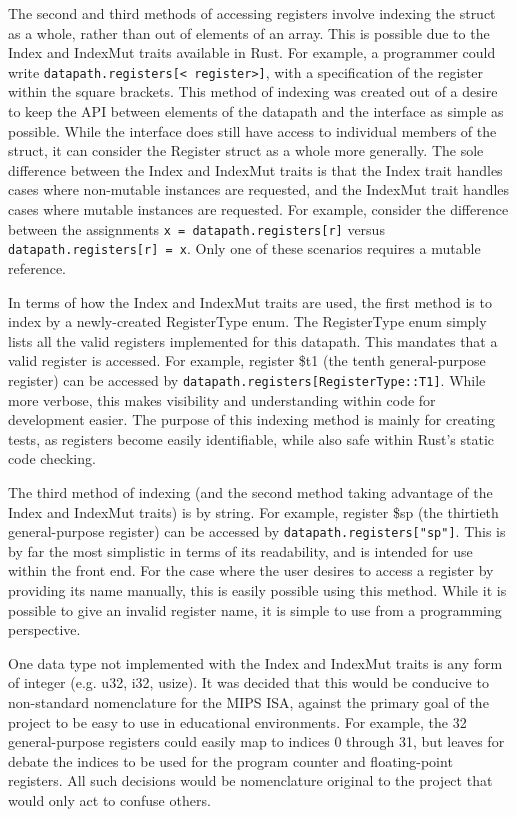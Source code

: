 \documentclass[
    paper=letter,
    parskip=half,
    fontsize=12pt,
    titlepage=firstiscover,
    toc=bibliography,
    numbers=endperiod
]{scrartcl}
\begin{document}
The second and third methods of accessing registers involve indexing the
struct as a whole, rather than out of elements of an array. This is
possible due to the Index and IndexMut traits available in Rust. For
example, a programmer could write \texttt{datapath.registers[\textless
            register\textgreater]}, with a specification of the register within the
square brackets. This method of indexing was created out of a desire to
keep the API between elements of the datapath and the interface as
simple as possible. While the interface does still have access to
individual members of the struct, it can consider the Register struct as
a whole more generally. The sole difference between the Index and
IndexMut traits is that the Index trait handles cases where non-mutable
instances are requested, and the IndexMut trait handles cases where
mutable instances are requested. For example, consider the difference
between the assignments \texttt{x = datapath.registers[r]} versus
\texttt{datapath.registers[r] = x}. Only one of these scenarios requires
a mutable reference.

In terms of how the Index and IndexMut traits are used, the first method
is to index by a newly-created RegisterType enum. The RegisterType enum
simply lists all the valid registers implemented for this datapath. This
mandates that a valid register is accessed. For example, register \$t1
(the tenth general-purpose register) can be accessed by
\texttt{datapath.registers[RegisterType::T1]}. While more verbose, this
makes visibility and understanding within code for development easier.
The purpose of this indexing method is mainly for creating tests, as
registers become easily identifiable, while also safe within Rust's
static code checking.

The third method of indexing (and the second method taking advantage of
the Index and IndexMut traits) is by string. For example, register \$sp
(the thirtieth general-purpose register) can be accessed by
\texttt{datapath.registers["sp"]}. This is by far the most simplistic in
terms of its readability, and is intended for use within the front end.
For the case where the user desires to access a register by providing
its name manually, this is easily possible using this method. While it
is possible to give an invalid register name, it is simple to use from a
programming perspective.

One data type not implemented with the Index and IndexMut traits is any
form of integer (e.g. u32, i32, usize). It was decided that this would
be conducive to non-standard nomenclature for the MIPS ISA, against the
primary goal of the project to be easy to use in educational
environments. For example, the 32 general-purpose registers could easily
map to indices 0 through 31, but leaves for debate the indices to be
used for the program counter and floating-point registers. All such
decisions would be nomenclature original to the project that would only
act to confuse others.
\end{document}
